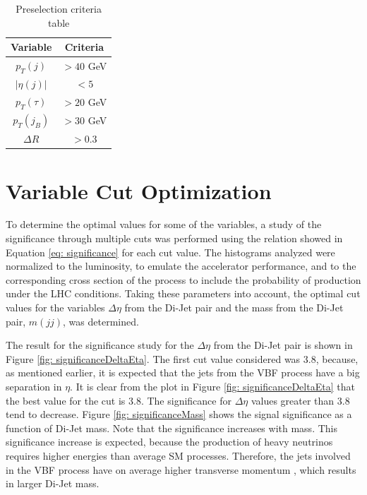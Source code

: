 \begin{table}
\centering
\begin{tabular}{|c|c|}
\hline
Variable & Criteria \\
\hline
$p_{T}(j)$ & $> 40$ GeV \\
$|\eta(j)|$ & $< 5$ \\ 
$p_{T}(\tau)$ & $> 20$ GeV \\
$p_{T}(j_{B})$ & $>30$ GeV \\
$\Delta R$ & $>0.3$ \\
\hline
\end{tabular}
\caption{Preselection criteria table}
\label{table: preselection}
\end{table}

\section{Variable Cut Optimization}

To determine the optimal values for some of the variables, a study of the significance through multiple cuts was performed using the relation showed in Equation \ref{eq: significance} for each cut value. The histograms analyzed were normalized to the luminosity, to emulate the accelerator performance, and to the corresponding cross section of the process to include the probability of production under the LHC conditions. Taking these parameters into account, the optimal cut values for the variables $\Delta \eta$ from the Di-Jet pair and the mass from the Di-Jet pair, $m(jj)$, was determined.

The result for the significance study for the $\Delta \eta$ from the Di-Jet pair is shown in Figure \ref{fig: significanceDeltaEta}. The first cut value considered was 3.8, because, as mentioned earlier, it is expected that the jets from the VBF process have a big separation in $\eta$. It is clear from the plot in Figure \ref{fig: significanceDeltaEta} that the best value for the cut is 3.8. The significance for $\Delta \eta$ values greater than 3.8 tend to decrease. Figure \ref{fig: significanceMass} shows the signal significance as a function of Di-Jet mass. Note that the significance increases with mass. This significance increase is expected, because the production of heavy neutrinos requires higher energies than average SM processes. Therefore, the jets involved in the VBF process have on average higher transverse momentum , which results in larger Di-Jet mass. 

